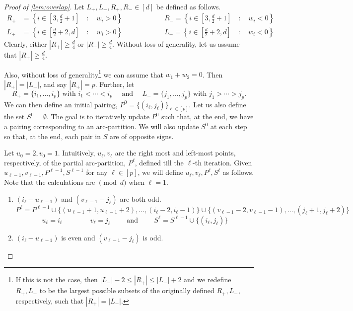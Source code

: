 \documentclass[10pt,a4paper]{article}
\theoremstyle{definition}%
\theoremstyle{plain}
\begin{document}
\begin{proof}[Proof of \autoref{lem:overlap}]
    Let $L_+, L_-, R_+, R_- \in [d]$ be defined as follows.
    \begin{align*}
        R_+ &= \left\{i \in  \left[ 3, \frac{d}{2}+1 \right] \quad : \quad w_i > 0 \right\}
        \qquad \qquad \qquad
        R_- = \left\{i \in  \left[ 3, \frac{d}{2}+1 \right] \quad : \quad w_i < 0 \right\}\\
        L_+ &= \left\{i \in  \left[\frac{d}{2}+2, d \right] \quad : \quad w_i > 0 \right\}
        \qquad \qquad \qquad
        L_- = \left\{i \in  \left[\frac{d}{2}+2, d \right] \quad : \quad w_i < 0 \right\}
    \end{align*}
    Clearly, either $|R_+|\geq\frac{d}{4}$ or $|R_-|\geq\frac{d}{4}$.
    Without loss of generality, let us assume that $|R_+|\geq\frac{d}{4}$.
    
    Also, without loss of generality\footnote{If this is not the case, then $|L_-| -2 \leq |R_+| \leq |L_-| + 2$ and we redefine $R_+, L_-$ to be the largest possible subsets of the originally defined $R_+, L_-$, respectively, such that $|R_+| = |L_-|$.} we can assume that $w_1 + w_2 = 0$.
    Then $|R_+| = |L_-|$, and say $|R_+| = p$.
    Further, let 
    \[
        R_+ = \{i_1, \ldots, i_p\} \text{ with } i_1 < \cdots < i_p \quad \text{ and } \quad L_- = \{j_1, \ldots, j_p\} \text{ with } j_1 > \cdots > j_p.
    \]
    We can then define an initial pairing, $P^0 = \{(i_\ell, j_\ell)\}_{\ell \in [p]}$.
    Let us also define the set $S^0 = \emptyset$.
    The goal is to iteratively update $P^0$ such that, at the end, we have a pairing corresponding to an arc-partition. 
    We will also update $S^0$ at each step so that, at the end, each pair in $S$ are of opposite signs.
    
    Let $u_0=2, v_0=1$.
    Intuitively, $u_\ell, v_\ell$ are the right most and left-most points, respectively, of the partial arc-partition, $P^\ell$, defined till the $\ell$-th iteration.
    Given $u_{\ell-1}, v_{\ell-1}, P^{\ell-1}, S^{\ell -1}$ for any $\ell \in [p]$, we will define $u_\ell, v_\ell, P^\ell, S^\ell$ as follows.
    Note that the calculations are $\pmod d$ when $\ell=1$.
    \begin{enumerate}
        \item[\underline{\textbf{Case 1:}} ]  $(i_\ell - u_{\ell-1})$ and $(v_{\ell-1} - j_\ell)$ are both odd.
        \[
            P^\ell = P^{\ell-1} \cup \{(u_{\ell-1}+1, u_{\ell-1}+2), \ldots, (i_\ell -2, i_\ell -1)\} \cup \{(v_{\ell-1}-2, v_{\ell-1}-1), \ldots, (j_\ell +1, j_\ell +2)\}
        \]
        \[
            u_\ell = i_\ell \qquad \qquad v_\ell = j_\ell \qquad \text{ and } \qquad S^\ell = S^{\ell -1} \cup \{(i_\ell, j_\ell) \}
        \]
        \item[\underline{\textbf{Case 2:}} ] $(i_\ell - u_{\ell-1})$ is even and $(v_{\ell-1} - j_\ell)$ is odd.
        

\end{enumerate}
\end{proof}
\end{document}

